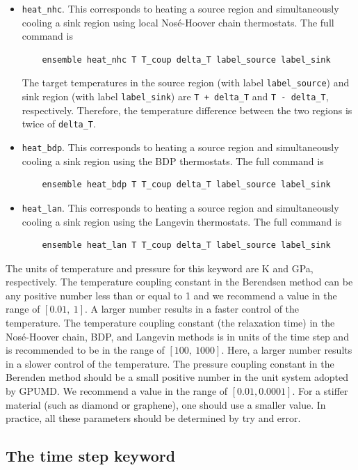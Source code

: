 \documentclass[12pt,a4paper]{report}
\begin{document}
\begin{itemize}
\item \verb"heat_nhc". This corresponds to heating a source region and simultaneously cooling a sink region using local Nos\'{e}-Hoover chain thermostats. The full command is
\begin{verbatim}
    ensemble heat_nhc T T_coup delta_T label_source label_sink
\end{verbatim}
The target temperatures in the source region (with label \verb"label_source") and sink region (with label \verb"label_sink") are \verb"T + delta_T" and \verb"T - delta_T", respectively. Therefore, the temperature difference between the two regions is twice of \verb"delta_T".

\item \verb"heat_bdp". This corresponds to heating a source region and simultaneously cooling a sink region using the BDP thermostats. The full command is
\begin{verbatim}
    ensemble heat_bdp T T_coup delta_T label_source label_sink
\end{verbatim}


\item \verb"heat_lan". This corresponds to heating a source region and simultaneously cooling a sink region using the Langevin thermostats. The full command is
\begin{verbatim}
    ensemble heat_lan T T_coup delta_T label_source label_sink
\end{verbatim}

\end{itemize}


The units of temperature and pressure for this keyword are K and GPa, respectively. The temperature coupling constant in the Berendsen method can be any positive number less than or equal to 1 and we recommend a value in the range of $[0.01,~1]$. A larger number results in a faster control of the temperature. The temperature coupling constant (the relaxation time) in the Nos\'{e}-Hoover chain, BDP, and Langevin methods is in units of the time step and is recommended to be in the range of $[100,~1000]$. Here, a larger number results in a slower control of the temperature. The pressure coupling constant in the Berenden method should be a small positive number in the unit system adopted by GPUMD. We recommend a value in the range of $[0.01,0.0001]$. For a stiffer material (such as diamond or graphene), one should use a smaller value. In practice, all these parameters should be determined by try and error.


\subsection{The time step keyword}
\end{document}
